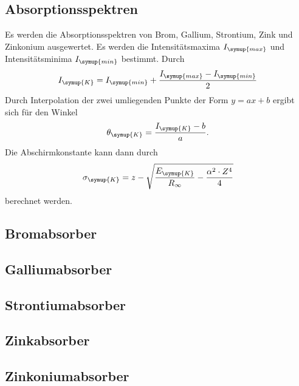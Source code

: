 \subsection{Absorptionsspektren}
\label{sec:Absorptionsspektren}
Es werden die Absorptionsspektren von Brom, Gallium, Strontium, Zink und Zinkonium ausgewertet. Es werden die
Intensitätsmaxima $I_{\symup{max}}$ und Intensitätsminima $I_{\symup{min}}$ bestimmt. Durch
\begin{align*}
  I_{\symup{K}} = I_{\symup{min}} + \frac{I_{\symup{max}} - I_{\symup{min}}}{2}
\end{align*}
Durch Interpolation der zwei umliegenden Punkte der Form $y = ax + b$ ergibt sich für den Winkel
\begin{align*}
  \theta_{\symup{K}} = \frac{I_{\symup{K}}-b}{a}.
\end{align*}
Die Abschirmkonstante kann dann durch
\begin{align*}
  \sigma_{\symup{K}} = z - \sqrt{\frac{E_{\symup{K}}}{R_{\infty}}-\frac{\alpha^2 \cdot Z^4}{4}}
\end{align*}
berechnet werden.

\subsection{Bromabsorber}
\label{sec:Brom}


\subsection{Galliumabsorber}
\label{sec:Gallium}

\subsection{Strontiumabsorber}
\label{sec:Strontium}

\subsection{Zinkabsorber}
\label{sec:Zink}

\subsection{Zinkoniumabsorber}
\label{sec:Zinkonium}